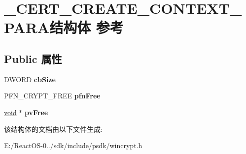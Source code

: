 \hypertarget{struct___c_e_r_t___c_r_e_a_t_e___c_o_n_t_e_x_t___p_a_r_a}{}\section{\+\_\+\+C\+E\+R\+T\+\_\+\+C\+R\+E\+A\+T\+E\+\_\+\+C\+O\+N\+T\+E\+X\+T\+\_\+\+P\+A\+R\+A结构体 参考}
\label{struct___c_e_r_t___c_r_e_a_t_e___c_o_n_t_e_x_t___p_a_r_a}
\subsection*{Public 属性}
\begin{DoxyCompactItemize}
\item 
\mbox{\label{struct___c_e_r_t___c_r_e_a_t_e___c_o_n_t_e_x_t___p_a_r_a_aacc6fbafdfa75430f686816713a913fb}} 
D\+W\+O\+RD {\bfseries cb\+Size}
\item 
\mbox{\label{struct___c_e_r_t___c_r_e_a_t_e___c_o_n_t_e_x_t___p_a_r_a_a44cb29bd44bde9e05f56c42a794bb25c}} 
P\+F\+N\+\_\+\+C\+R\+Y\+P\+T\+\_\+\+F\+R\+EE {\bfseries pfn\+Free}
\item 
\mbox{\label{struct___c_e_r_t___c_r_e_a_t_e___c_o_n_t_e_x_t___p_a_r_a_a2d6863c66deb2cceb6398e85265842fb}} 
\hyperlink{interfacevoid}{void} $\ast$ {\bfseries pv\+Free}
\end{DoxyCompactItemize}


该结构体的文档由以下文件生成\+:\begin{DoxyCompactItemize}
\item 
E\+:/\+React\+O\+S-\/0../sdk/include/psdk/wincrypt.\+h\end{DoxyCompactItemize}
